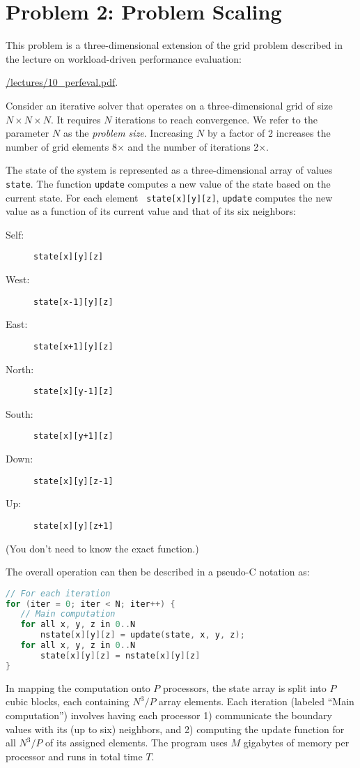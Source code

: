 \documentclass[11pt]{article}
\newcommand{\cref}[2]{\href{#1}{\color{blue}#2}}
\begin{document}
\section*{Problem 2: Problem Scaling}

This problem is a three-dimensional extension of the grid problem
described in the lecture on workload-driven performance evaluation:
\begin{center}
\cref{\actualcoursehome/lectures/10_perfeval.pdf}{\visiblecoursehome/lectures/10\_perfeval.pdf}.
\end{center}


Consider an iterative solver that operates on a three-dimensional grid
of size $N \times N \times N$.  It requires
$N$ iterations to reach convergence.  We refer to
the parameter $N$ as the {\em problem size}.  Increasing $N$ by a
factor of 2 increases the number of grid elements 8$\times$ and the number
of iterations 2$\times$.

The state of the system is represented as a three-dimensional array of
values {\tt state}.  The function {\tt update} computes a new value of
the state based on the current state.  For each element {\tt
  state[x][y][z]}, {\tt update} computes the new value as a function of its current value and that
of its six neighbors:
\begin{description}
\item[Self:]  {\tt state[x][y][z]}
\item[West:] {\tt state[x-1][y][z]}
\item[East:] {\tt state[x+1][y][z]}
\item[North:] {\tt state[x][y-1][z]}
\item[South:] {\tt state[x][y+1][z]}
\item[Down:] {\tt state[x][y][z-1]}
\item[Up:] {\tt state[x][y][z+1]}
\end{description}
(You don't need to know the exact function.)

The overall operation can then be described in a pseudo-C notation as:
\begin{lstlisting}[language=C,basicstyle=\ttfamily]
// For each iteration
for (iter = 0; iter < N; iter++) {
   // Main computation
   for all x, y, z in 0..N
       nstate[x][y][z] = update(state, x, y, z);
   for all x, y, z in 0..N
       state[x][y][z] = nstate[x][y][z]
}
\end{lstlisting}

In mapping the computation onto $P$ processors, the state array is
split into $P$ cubic blocks, each containing $N^3/P$ array elements.
Each iteration (labeled ``Main computation'') involves
having each processor 1) communicate the boundary values with its (up
to six) neighbors, and 2) computing the update function for all
$N^3/P$ of its assigned elements.  The program uses $M$ gigabytes of
memory per processor and runs in total time $T$.
\end{document}

